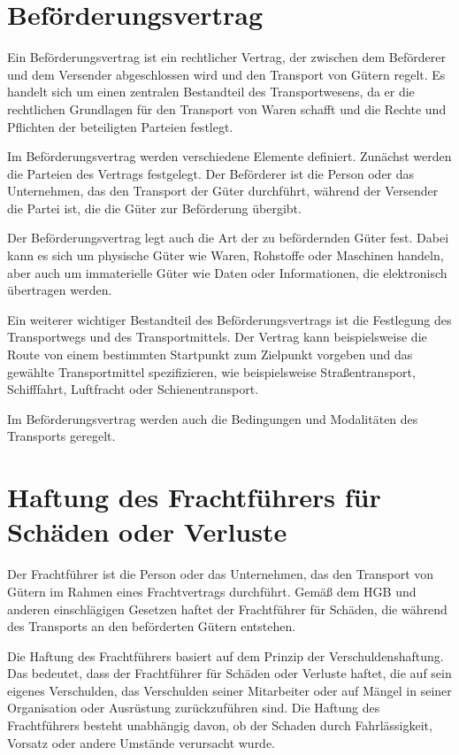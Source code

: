 \section{Beförderungsvertrag}
Ein Beförderungsvertrag ist ein rechtlicher Vertrag, der zwischen dem Beförderer und dem Versender abgeschlossen wird und den Transport von Gütern regelt. Es handelt sich um einen zentralen Bestandteil des Transportwesens, da er die rechtlichen Grundlagen für den Transport von Waren schafft und die Rechte und Pflichten der beteiligten Parteien festlegt.

Im Beförderungsvertrag werden verschiedene Elemente definiert. Zunächst werden die Parteien des Vertrags festgelegt. Der Beförderer ist die Person oder das Unternehmen, das den Transport der Güter durchführt, während der Versender die Partei ist, die die Güter zur Beförderung übergibt.

Der Beförderungsvertrag legt auch die Art der zu befördernden Güter fest. Dabei kann es sich um physische Güter wie Waren, Rohstoffe oder Maschinen handeln, aber auch um immaterielle Güter wie Daten oder Informationen, die elektronisch übertragen werden.

Ein weiterer wichtiger Bestandteil des Beförderungsvertrags ist die Festlegung des Transportwegs und des Transportmittels. Der Vertrag kann beispielsweise die Route von einem bestimmten Startpunkt zum Zielpunkt vorgeben und das gewählte Transportmittel spezifizieren, wie beispielsweise Straßentransport, Schifffahrt, Luftfracht oder Schienentransport.

Im Beförderungsvertrag werden auch die Bedingungen und Modalitäten des Transports geregelt.
\section{Haftung des Frachtführers für Schäden oder Verluste}
Der Frachtführer ist die Person oder das Unternehmen, das den Transport von Gütern im Rahmen eines Frachtvertrags durchführt. Gemäß dem \ac{HGB} und anderen einschlägigen Gesetzen haftet der Frachtführer für Schäden, die während des Transports an den beförderten Gütern entstehen.

Die Haftung des Frachtführers basiert auf dem Prinzip der Verschuldenshaftung. Das bedeutet, dass der Frachtführer für Schäden oder Verluste haftet, die auf sein eigenes Verschulden, das Verschulden seiner Mitarbeiter oder auf Mängel in seiner Organisation oder Ausrüstung zurückzuführen sind. Die Haftung des Frachtführers besteht unabhängig davon, ob der Schaden durch Fahrlässigkeit, Vorsatz oder andere Umstände verursacht wurde.


